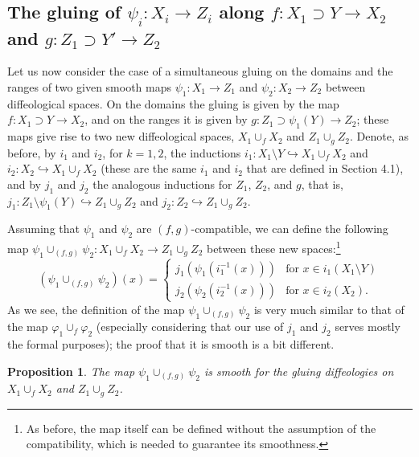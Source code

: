 \documentclass{article}
\newtheorem{prop}[lemma]{Proposition}
\begin{document}
\subsection{The gluing of $\psi_i:X_i\to Z_i$ along $f:X_1\supset Y\to X_2$ and $g:Z_1\supset Y'\to Z_2$}\label{f-g:gluing:of:maps:sect}

Let us now consider the case of a simultaneous gluing on the domains and the ranges of two given smooth maps $\psi_1:X_1\to Z_1$ and $\psi_2:X_2\to Z_2$ between diffeological spaces. On the domains 
the gluing is given by the map $f:X_1\supset Y\to X_2$, and on the ranges it is given by $g:Z_1\supset\psi_1(Y)\to Z_2$; these maps give rise to two new diffeological spaces, $X_1\cup_f X_2$ and
$Z_1\cup_g Z_2$. Denote, as before, by $i_1$ and $i_2$, for $k=1,2$, the inductions $i_1:X_1\setminus Y\hookrightarrow X_1\cup_f X_2$ and $i_2:X_2\hookrightarrow X_1\cup_f X_2$ (these are the same 
$i_1$ and $i_2$ that are defined in Section 4.1), and by $j_1$ and $j_2$ the analogous inductions for $Z_1$, $Z_2$, and $g$, that is, $j_1:Z_1\setminus\psi_1(Y)\hookrightarrow Z_1\cup_g Z_2$ and
$j_2:Z_2\hookrightarrow Z_1\cup_g Z_2$.

Assuming that $\psi_1$ and $\psi_2$ are $(f,g)$-compatible, we can define the following map $\psi_1\cup_{(f,g)}\psi_2:X_1\cup_f X_2\to Z_1\cup_g Z_2$ between these new spaces:\footnote{As before, the 
map itself can be defined without the assumption of the compatibility, which is needed to guarantee its smoothness.}
$$(\psi_1\cup_{(f,g)}\psi_2)(x)=\left\{\begin{array}{ll} j_1(\psi_1(i_1^{-1}(x))) & \mbox{for }x\in i_1(X_1\setminus Y)\\
j_2(\psi_2(i_2^{-1}(x))) & \mbox{for }x\in i_2(X_2).\end{array}\right.$$ As we see, the definition of the map $\psi_1\cup_{(f,g)}\psi_2$ is very much similar to that of the map $\varphi_1\cup_f\varphi_2$
(especially considering that our use of $j_1$ and $j_2$ serves mostly the formal purposes); the proof that it is smooth is a bit different.

\begin{prop}
The map $\psi_1\cup_{(f,g)}\psi_2$ is smooth for the gluing diffeologies on $X_1\cup_f X_2$ and $Z_1\cup_g Z_2$.
\end{prop}
\end{document}
